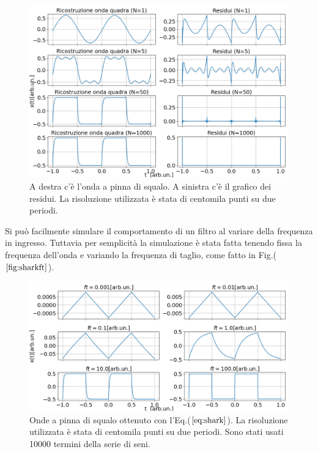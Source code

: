 \documentclass{article}
\begin{document}
                    \begin{figure}[H]
                        \centering
                        \includegraphics[width=1\textwidth]{fousharkfins1e5.png} %
                        \caption{A destra c'è l'onda a pinna di squalo.
                        A sinistra c'è il grafico dei residui.
                        La risoluzione utilizzata è stata di centomila punti su due periodi.}
                        \label{fig:shark1e5}
                    \end{figure}
                Si può facilmente simulare il comportamento di  un filtro al
                variare della frequenza in ingresso. Tuttavia per semplicità 
                la simulazione è stata fatta tenendo fissa la frequenza dell'onda e 
                variando la frequenza di taglio, come fatto in Fig.($\ref{fig:sharkft}$).
                    \begin{figure}[H]
                        \centering
                        \includegraphics[width=1\textwidth]{fousharkfinsfts1.png} %
                        \caption{Onde a pinna di squalo ottenuto con l'Eq.($\ref{eq:shark}$).
                        La risoluzione utilizzata è stata di centomila punti su due periodi.
                        Sono stati usati 10000 termini della serie di seni.}
                        \label{fig:sharkft}
                    \end{figure}
\end{document}
